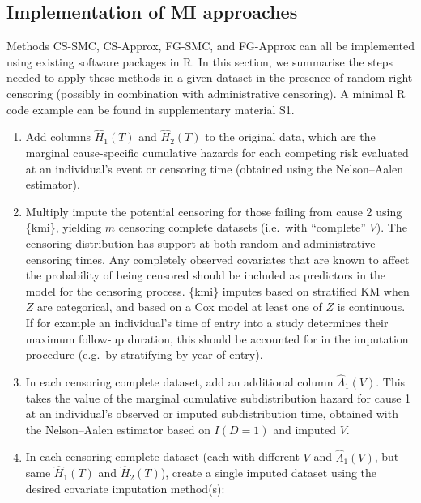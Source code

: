 \documentclass[
  letterpaper,
  DIV=11,
  numbers=noendperiod]{scrreprt}
\begin{document}
\subsection{Implementation of MI
approaches}\label{implementation-of-mi-approaches}

Methods CS-SMC, CS-Approx, FG-SMC, and FG-Approx can all be implemented
using existing software packages in R. In this section, we summarise the
steps needed to apply these methods in a given dataset in the presence
of random right censoring (possibly in combination with administrative
censoring). A minimal R code example can be found in supplementary
material S1.

\begin{enumerate}
\def\labelenumi{\arabic{enumi}.}
\item
  Add columns \(\hat{H}_1(T)\) and \(\hat{H}_2(T)\) to the original
  data, which are the marginal cause-specific cumulative hazards for
  each competing risk evaluated at an individual's event or censoring
  time (obtained using the Nelson--Aalen estimator).
\item
  Multiply impute the potential censoring for those failing from cause 2
  using \{kmi\}, yielding \(m\) censoring complete datasets (i.e.~with
  ``complete'' \(V\)). The censoring distribution has support at both
  random and administrative censoring times. Any completely observed
  covariates that are known to affect the probability of being censored
  should be included as predictors in the model for the censoring
  process. \{kmi\} imputes based on stratified KM when \(Z\) are
  categorical, and based on a Cox model at least one of \(Z\) is
  continuous. If for example an individual's time of entry into a study
  determines their maximum follow-up duration, this should be accounted
  for in the imputation procedure (e.g.~by stratifying by year of
  entry).
\item
  In each censoring complete dataset, add an additional column
  \(\hat{\Lambda}_1(V)\). This takes the value of the marginal
  cumulative subdistribution hazard for cause 1 at an individual's
  observed or imputed subdistribution time, obtained with the
  Nelson--Aalen estimator based on \(I(D = 1)\) and imputed \(V\).
\item
  In each censoring complete dataset (each with different \(V\) and
  \(\hat{\Lambda}_1(V)\), but same \(\hat{H}_1(T)\) and
  \(\hat{H}_2(T)\)), create a single imputed dataset using the desired
  covariate imputation method(s):


\end{enumerate}
\end{document}
